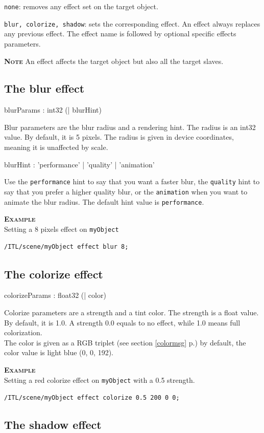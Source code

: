 \documentclass[a4paper,twoside]{report}
\newcommand{\subsublevel}[1]	{\subsection{#1}}
\newcommand{\fullref}[1]	{\ref{#1} p.\pageref{#1}}
\newcommand{\OSC}[1]		{\texttt{#1}}
\newcommand{\example}		{\textbf{\hspace{-1.5cm}\textbf{\textsc{Example }}}}
\newcommand{\note}	[1]		{\vspace{2mm}\textbf{\hspace{-0.9cm}\textbf{\textsc{Note #1}}}}
\let\olditemize\itemize
\let\oldenditemize\enditemize
\renewenvironment{itemize} 	{\olditemize \setlength{\itemsep}{1mm}}{\oldenditemize}
\newcommand{\sample}	[1]			{\vspace{-2mm}\begin{center}\colorbox{mygrey}{
								\begin{minipage}[t]{0.9\columnwidth} 
								{\small \texttt{#1}}
								\end{minipage}}\end{center}}
\begin{document}
\begin{itemize}
\item \OSC{none}: removes any effect set on the target object.
\item \OSC{blur, colorize, shadow}: sets the corresponding effect. An effect always replaces any previous effect. The effect name is followed by optional specific effects parameters.
\end{itemize}

\note{} An effect affects the target object but also all the target slaves.

\subsublevel{The blur effect}

\begin{rail}
blurParams : int32 (| blurHint)
\end{rail}

Blur parameters are the blur radius and a rendering hint. The radius is an int32 value. By default, it is 5 pixels. The radius is given in device coordinates, meaning it is unaffected by scale. 

\begin{rail}
blurHint : 'performance' | 'quality' | 'animation'
\end{rail}
Use the \OSC{performance} hint to say that you want a faster blur, the \OSC{quality} hint to say that you prefer a higher quality blur, or the \OSC{animation} when you want to animate the blur radius. The default hint value is \OSC{performance}.

\example \\
Setting a 8 pixels effect on \OSC{myObject}
\sample{/ITL/scene/myObject effect blur 8;}

\subsublevel{The colorize effect}

\begin{rail}
colorizeParams : float32 (| color)
\end{rail}

Colorize parameters are a strength and a tint color. The strength is a float value. By default, it is 1.0. A strength 0.0 equals to no effect, while 1.0 means full colorization. \\
The color is given as a RGB triplet (see section \fullref{colormsg}) by default, the color value is light blue (0, 0, 192).

\example \\
Setting a red colorize effect on \OSC{myObject} with a 0.5 strength.
\sample{/ITL/scene/myObject effect colorize 0.5 200 0 0;}


\subsublevel{The shadow effect}
\end{document}
